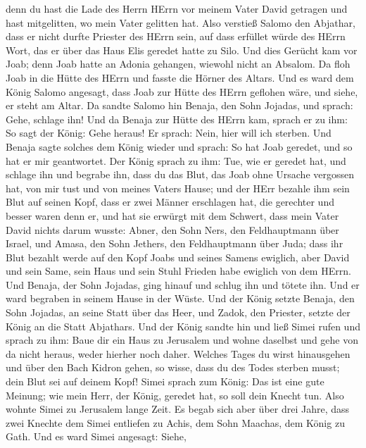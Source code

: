 denn du hast die Lade des Herrn HErrn vor meinem Vater David getragen
und hast mitgelitten, wo mein Vater gelitten hat.  Also
verstieß Salomo den Abjathar, dass er nicht durfte Priester des HErrn
sein, auf dass erfüllet würde des HErrn Wort, das er über das Haus Elis
geredet hatte zu Silo.  Und dies Gerücht kam vor Joab; denn
Joab hatte an Adonia gehangen, wiewohl nicht an Absalom. Da floh Joab in
die Hütte des HErrn und fasste die Hörner des Altars.  Und
es ward dem König Salomo angesagt, dass Joab zur Hütte des HErrn
geflohen wäre, und siehe, er steht am Altar. Da sandte Salomo hin
Benaja, den Sohn Jojadas, und sprach: Gehe, schlage ihn! 
Und da Benaja zur Hütte des HErrn kam, sprach er zu ihm: So sagt der
König: Gehe heraus! Er sprach: Nein, hier will ich sterben. Und Benaja
sagte solches dem König wieder und sprach: So hat Joab geredet, und so
hat er mir geantwortet.  Der König sprach zu ihm: Tue, wie
er geredet hat, und schlage ihn und begrabe ihn, dass du das Blut, das
Joab ohne Ursache vergossen hat, von mir tust und von meines Vaters
Hause;  und der HErr bezahle ihm sein Blut auf seinen Kopf,
dass er zwei Männer erschlagen hat, die gerechter und besser waren denn
er, und hat sie erwürgt mit dem Schwert, dass mein Vater David nichts
darum wusste: Abner, den Sohn Ners, den Feldhauptmann über Israel, und
Amasa, den Sohn Jethers, den Feldhauptmann über Juda;  dass
ihr Blut bezahlt werde auf den Kopf Joabs und seines Samens ewiglich,
aber David und sein Same, sein Haus und sein Stuhl Frieden habe ewiglich
von dem HErrn.  Und Benaja, der Sohn Jojadas, ging hinauf
und schlug ihn und tötete ihn. Und er ward begraben in seinem Hause in
der Wüste.  Und der König setzte Benaja, den Sohn Jojadas,
an seine Statt über das Heer, und Zadok, den Priester, setzte der König
an die Statt Abjathars.  Und der König sandte hin und ließ
Simei rufen und sprach zu ihm: Baue dir ein Haus zu Jerusalem und wohne
daselbst und gehe von da nicht heraus, weder hierher noch daher.
 Welches Tages du wirst hinausgehen und über den Bach
Kidron gehen, so wisse, dass du des Todes sterben musst; dein Blut sei
auf deinem Kopf!  Simei sprach zum König: Das ist eine gute
Meinung; wie mein Herr, der König, geredet hat, so soll dein Knecht tun.
Also wohnte Simei zu Jerusalem lange Zeit.  Es begab sich
aber über drei Jahre, dass zwei Knechte dem Simei entliefen zu Achis,
dem Sohn Maachas, dem König zu Gath. Und es ward Simei angesagt: Siehe,
